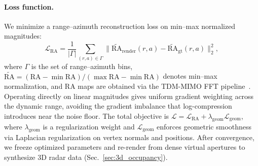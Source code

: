 \paragraph{Loss function.}
We minimize a range--azimuth reconstruction loss on min--max normalized magnitudes:
\begin{equation}
    \mathcal{L}_\mathrm{RA}
    =
    \frac{1}{|\Gamma|}
    \sum_{(r,a)\in\Gamma}
    \big\lVert \widetilde{\mathrm{RA}}_\mathrm{render}(r,a) - \widetilde{\mathrm{RA}}_\mathrm{gt}(r,a) \big\rVert_2^2,
    \label{eq:ra_loss}
\end{equation}
where $\Gamma$ is the set of range--azimuth bins, $\widetilde{\mathrm{RA}} = (\mathrm{RA} - \min\mathrm{RA}) / (\max\mathrm{RA} - \min\mathrm{RA})$ denotes min--max normalization, and RA maps are obtained via the TDM-MIMO FFT pipeline~\cite{9658500}. Operating directly on linear magnitudes gives uniform gradient weighting across the dynamic range, avoiding the gradient imbalance that log-compression introduces near the noise floor. The total objective is $\mathcal{L} = \mathcal{L}_\mathrm{RA} + \lambda_\mathrm{geom}\mathcal{L}_\mathrm{geom}$, where $\lambda_\mathrm{geom}$ is a regularization weight and $\mathcal{L}_\mathrm{geom}$ enforces geometric smoothness via Laplacian regularization on vertex normals and positions. After convergence, we freeze optimized parameters and re-render from dense virtual apertures to synthesize 3D radar data (Sec.~\ref{sec:3d_occupancy}).
